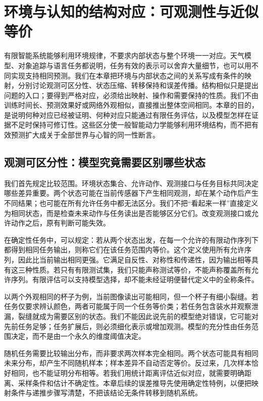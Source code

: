 \chapter{环境与认知的结构对应：可观测性与近似等价}
\label{chp:holomorphic_isomorphism}

有限智能系统能够利用环境规律，不要求内部状态与整个环境一一对应。天气模型、对象追踪与语言任务都说明，任务有效的表示可以舍弃大量细节，也可以用不同实现支持相同预测。我们在本章把环境与内部状态之间的关系写成有条件的映射，分别讨论观测可区分性、状态压缩、转移保持和误差传播。结构相似只是提出问题的入口；要得到严格对应，必须给出映射、操作和需要保持的性质。我们不由训练时间长、预测效果好或网络外观相似，直接推出整体空间相同。本章的目的，是说明何种对应已经被证明、何种对应只能通过有限任务评估，以及模型怎样在证据不足时保持可修订性。这些区分使一般智能动力学能够利用环境结构，而不把有效预测扩大成关于全部世界与心智的同一性断言。

\section{观测可区分性：模型究竟需要区别哪些状态}
\label{sec:brain_cosmos}

我们首先规定比较范围。环境状态集合、允许动作、观测接口与任务目标共同决定哪些差异重要。两个状态可能在当前传感器下产生相同观测，却在某个动作后产生不同结果；也可能在所有允许任务中都无法区分。我们不把“看起来一样”直接定义为相同状态，而是检查未来动作与任务读出是否能够区分它们。改变观测接口或允许动作之后，原有判断可能失效。

在确定性任务中，可以规定：若从两个状态出发，在每一个允许的有限动作序列下都得到相同任务输出，则称它们在该任务范围内等价。这个定义使用所有允许序列，因此比当前输出相同更强。它满足自反性、对称性和传递性，因为输出相等具有这三种性质。若只有有限测试集，我们只能声称测试等价，不能声称覆盖所有允许序列。有限评估可以支持模型选择，却不能未经证明便替代定义中的全称条件。

以两个外观相同的杯子为例，当前图像读出可能相同，但一个杯子有细小裂缝。若任务仅要求辨认颜色，两者可能属于同一个任务等价类；若任务包含装水并观察泄漏，裂缝就成为需要区别的状态。我们不能因此说先前的模型绝对错误，它可能对先前任务足够；任务扩展后，则必须细化表示或增加观测。模型的充分性由任务范围决定，而不是由一个永久的维度阈值决定。

随机任务需要比较输出分布，而非要求两次样本完全相同。两个状态可能具有相同未来分布，却产生不同随机样本；样本差异不自动否定等价。反过来，几次样本恰好相同，也不能证明分布相等。若我们用统计距离评估近似对应，就需要明确距离、采样条件和估计不确定性。本章后续的误差推导先使用确定性特例，以便把映射条件与递推步骤写清楚，不把该结论无条件转移到随机系统。

